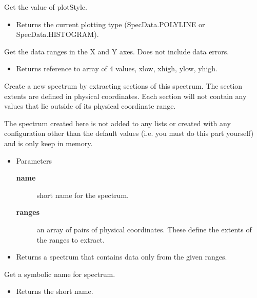 \begin{desc}Get the value of plotStyle.
\begin{itemize}
\item{Returns the current plotting type (SpecData.POLYLINE or
            SpecData.HISTOGRAM). }
\end{itemize}
\end{desc}

\begin{desc}Get the data ranges in the X and Y axes. Does not include data
 errors.
\begin{itemize}
\item{Returns reference to array of 4 values, xlow, xhigh, ylow, yhigh. }
\end{itemize}
\end{desc}

\begin{desc}Create a new spectrum by extracting sections of this spectrum.
 The section extents are defined in physical coordinates.
 Each section will not contain any values that lie outside of
 its physical coordinate range.
 
 The spectrum created here is not added to any lists or created
 with any configuration other than the default values (i.e. you
 must do this part yourself) and is only keep in memory.
\begin{itemize}
\item{Parameters
  \begin{description}
   \item[\textbf{name}]{short name for the spectrum.}
   \item[\textbf{ranges}]{an array of pairs of physical coordinates. These
               define the extents of the ranges to extract.}
  \end{description}}
\end{itemize}
\begin{itemize}
\item{Returns a spectrum that contains data only from the given
         ranges. }
\end{itemize}
\end{desc}

\begin{desc}Get a symbolic name for spectrum.
\begin{itemize}
\item{Returns the short name. }
\end{itemize}
\end{desc}

